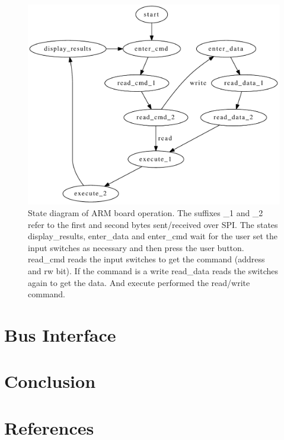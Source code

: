\documentclass{article}
\begin{document}
\begin{figure}
\center
\includegraphics[scale=0.8]{figure/arm-state_diagram/arm-state_diagram}
\caption{State diagram of ARM board operation.
The suffixes \_1 and \_2 refer to the first and second bytes
sent/received over SPI.
The states display\_results, enter\_data and enter\_cmd 
wait for the user set the input switches as necessary and then press
the user button.
read\_cmd reads the input switches to get the command (address and rw bit).
If the command is a write read\_data reads the switches again to get the data.
And execute performed the read/write command.
}
\label{fig:armstate}
\end{figure}


\section{Bus Interface}


\section{Conclusion}


\clearpage

\pagebreak
\renewcommand*{\refname}{\vspace{-8mm}}
\section{References}
%


\end{document}
